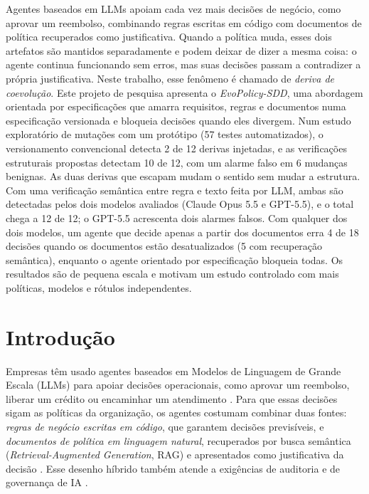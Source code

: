 \documentclass[12pt]{article}
\begin{document}
\sloppy
\begin{resumo}
Agentes baseados em LLMs apoiam cada vez mais decisões de negócio, como aprovar um reembolso, combinando regras escritas em código com documentos de política recuperados como justificativa. Quando a política muda, esses dois artefatos são mantidos separadamente e podem deixar de dizer a mesma coisa: o agente continua funcionando sem erros, mas suas decisões passam a contradizer a própria justificativa. Neste trabalho, esse fenômeno é chamado de \textit{deriva de coevolução}. Este projeto de pesquisa apresenta o \textit{EvoPolicy-SDD}, uma abordagem orientada por especificações que amarra requisitos, regras e documentos numa especificação versionada e bloqueia decisões quando eles divergem. Num estudo exploratório de mutações com um protótipo (57 testes automatizados), o versionamento convencional detecta 2 de 12 derivas injetadas, e as verificações estruturais propostas detectam 10 de 12, com um alarme falso em 6 mudanças benignas. As duas derivas que escapam mudam o sentido sem mudar a estrutura. Com uma verificação semântica entre regra e texto feita por LLM, ambas são detectadas pelos dois modelos avaliados (Claude Opus 5.5 e GPT-5.5), e o total chega a 12 de 12; o GPT-5.5 acrescenta dois alarmes falsos. Com qualquer dos dois modelos, um agente que decide apenas a partir dos documentos erra 4 de 18 decisões quando os documentos estão desatualizados (5 com recuperação semântica), enquanto o agente orientado por especificação bloqueia todas. Os resultados são de pequena escala e motivam um estudo controlado com mais políticas, modelos e rótulos independentes.
\end{resumo}

\section{Introdu\c{c}\~ao}
\label{sec1:intro}

Empresas têm usado agentes baseados em Modelos de Linguagem de Grande Escala (LLMs) para apoiar decisões operacionais, como aprovar um reembolso, liberar um crédito ou encaminhar um atendimento \cite{yao2023react,wang2024agentsurvey}. Para que essas decisões sigam as políticas da organização, os agentes costumam combinar duas fontes: \textit{regras de negócio escritas em código}, que garantem decisões previsíveis, e \textit{documentos de política em linguagem natural}, recuperados por busca semântica (\textit{Retrieval-Augmented Generation}, RAG) e apresentados como justificativa da decisão \cite{lewis2020rag,gao2023ragsurvey}. Esse desenho híbrido também atende a exigências de auditoria e de governança de IA \cite{nist2023airmf,ue2024aiact,raji2020accountability}.
\end{document}
